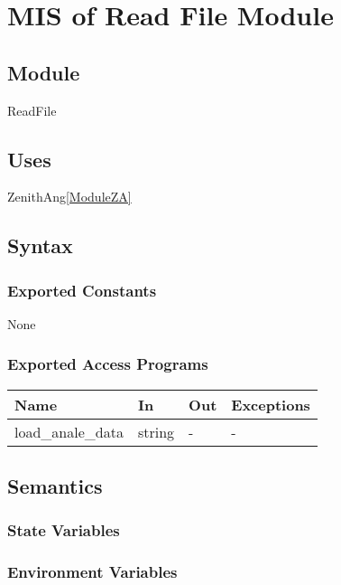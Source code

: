\documentclass[12pt, titlepage]{article}
\begin{document}
\newpage

\section{MIS of Read File Module} \label{ModuleR} 

\subsection{Module}
ReadFile


\subsection{Uses}
ZenithAng\ref{ModuleZA}


\subsection{Syntax}

\subsubsection{Exported Constants}
None

\subsubsection{Exported Access Programs}

\begin{center}
\begin{tabular}{p{3cm} p{3cm} p{3cm} p{2cm}}
\hline
\textbf{Name} & \textbf{In} & \textbf{Out} & \textbf{Exceptions} \\
\hline 
load\_anale\_data & string & - & -\\


\hline
\end{tabular}
\end{center}


\subsection{Semantics}

\subsubsection{State Variables}



\subsubsection{Environment Variables}
\end{document}
